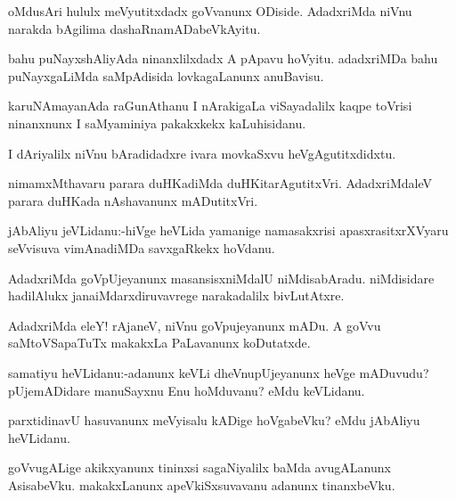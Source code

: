 \documentclass{article}
\begin{document}
\begin{mn}%
oMdusAri hululx meVyutitxdadx goVvanunx ODiside. AdadxriMda niVnu narakda bAgilima 
dashaRnamADabeVkAyitu.
\end{mn}

\begin{mn}%
bahu puNayxshAliyAda ninanxlilxdadx A pApavu hoVyitu. adadxriMDa bahu puNayxgaLiMda 
saMpAdisida lovkagaLanunx anuBavisu.
\end{mn}

\begin{mn}%
karuNAmayanAda raGunAthanu I nArakigaLa viSayadalilx kaqpe toVrisi ninanxnunx I 
saMyaminiya pakakxkekx kaLuhisidanu.
\end{mn}

\begin{mn}%
I dAriyalilx niVnu bAradidadxre ivara movkaSxvu heVgAgutitxdidxtu.
\end{mn}

\begin{mn}%
nimamxMthavaru parara duHKadiMda duHKitarAgutitxVri. AdadxriMdaleV parara duHKada 
nAshavanunx mADutitxVri.
\end{mn}

\begin{mn}%
jAbAliyu jeVLidanu:-hiVge heVLida yamanige namasakxrisi apasxrasitxrXVyaru seVvisuva 
vimAnadiMDa savxgaRkekx hoVdanu.
\end{mn}

\begin{mn}%
AdadxriMda goVpUjeyanunx  masansisxniMdalU niMdisabAradu. niMdisidare hadilAlukx 
janaiMdarxdiruvavrege narakadalilx bivLutAtxre.
\end{mn}

\begin{mn}%
AdadxriMda eleY! rAjaneV, niVnu goVpujeyanunx mADu. A goVvu saMtoVSapaTuTx makakxLa 
PaLavanunx koDutatxde.
\end{mn}

\begin{mn}%
samatiyu heVLidanu:-adanunx keVLi dheVnupUjeyanunx heVge mADuvudu? pUjemADidare manuSayxnu 
Enu hoMduvanu? eMdu keVLidanu.
\end{mn}

\begin{mn}%
parxtidinavU hasuvanunx meVyisalu kADige hoVgabeVku? eMdu jAbAliyu heVLidanu.
\end{mn}

\begin{mn}%
goVvugALige akikxyanunx tininxsi sagaNiyalilx baMda avugALanunx  AsisabeVku. makakxLanunx 
apeVkiSxsuvavanu adanunx tinanxbeVku.
\end{mn}
\end{document}
